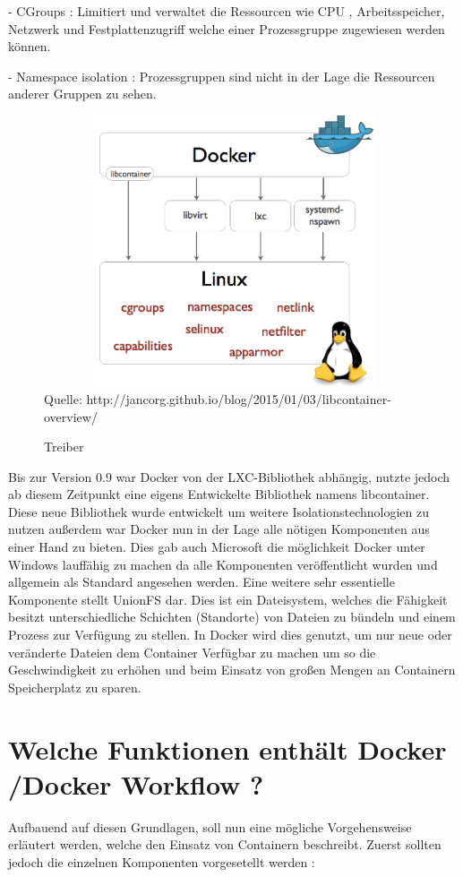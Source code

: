 \documentclass[12pt,toc=bib,toc=listof]{scrreprt}
\begin{document}
- CGroups : Limitiert und verwaltet die Ressourcen wie CPU , Arbeitsspeicher, Netzwerk und Festplattenzugriff welche einer Prozessgruppe zugewiesen werden können. 

- Namespace isolation : Prozessgruppen sind nicht in der Lage die Ressourcen anderer Gruppen zu sehen.

\begin{figure}
	\centering
	\caption{Treiber}
	\includegraphics[width=15cm, height=8cm, scale=0.3]{docker-execdriver-diagram.png}
	Quelle: http://jancorg.github.io/blog/2015/01/03/libcontainer-overview/
\end{figure}

Bis zur Version 0.9 war Docker von der LXC-Bibliothek abhängig, nutzte jedoch ab diesem Zeitpunkt eine eigens Entwickelte Bibliothek namens libcontainer.
Diese neue Bibliothek wurde entwickelt um weitere Isolationstechnologien zu nutzen außerdem war Docker nun in der Lage alle nötigen Komponenten aus einer Hand zu bieten.
Dies gab auch Microsoft die möglichkeit Docker unter Windows lauffähig zu machen da alle Komponenten veröffentlicht wurden und allgemein als Standard angesehen werden.
Eine weitere sehr essentielle Komponente stellt UnionFS dar.
Dies ist ein Dateisystem, welches die Fähigkeit besitzt unterschiedliche Schichten (Standorte) von Dateien zu bündeln und einem Prozess zur Verfügung zu stellen.
In Docker wird dies genutzt, um nur neue oder veränderte Dateien dem Container Verfügbar zu machen um so die Geschwindigkeit zu erhöhen und beim Einsatz von großen Mengen an Containern Speicherplatz zu sparen.


\section{Welche Funktionen enthält Docker /Docker Workflow ?}
Aufbauend auf diesen Grundlagen, soll nun eine mögliche Vorgehensweise erläutert werden, welche den Einsatz von Containern beschreibt.
Zuerst sollten jedoch die einzelnen Komponenten vorgesetellt werden :
\end{document}
